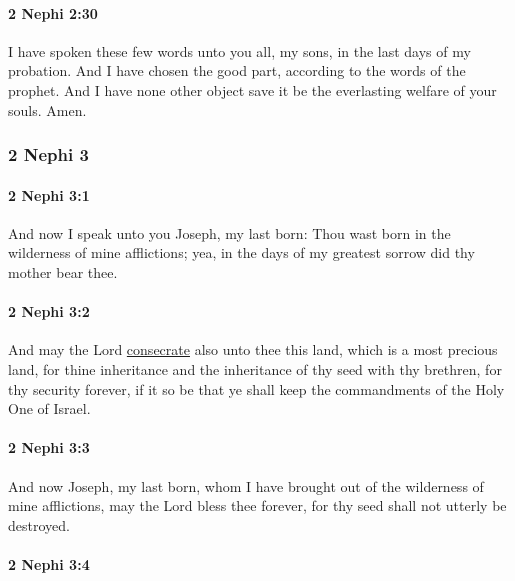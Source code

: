 		\paragraph{2 Nephi 2:30} %
			\label{2NEPHI-2-30}

			I have spoken these few words unto you all, my sons,
			in the last days of my probation.
			And I have chosen the good part, according to the words of the prophet.
			And I have none other object save it be the everlasting welfare of your souls.
			Amen.
			
	\subsubsection{2 Nephi 3} %
		\label{2NEPHI-3}
		
		\paragraph{2 Nephi 3:1} %
			\label{2NEPHI-3-1}

			And now I speak unto you Joseph, my last born:
			Thou wast born in the wilderness of mine afflictions;
			yea, in the days of my greatest sorrow did thy mother bear thee.

		\paragraph{2 Nephi 3:2} %
			\label{2NEPHI-3-2}

			And may the Lord \hyperref[CONSECRATION-1828]{consecrate} also unto thee this land,
			which is a most precious land,
			for thine inheritance and the inheritance of thy seed with thy brethren,
			for thy security forever,
			if it so be that ye shall keep the commandments of the Holy One of Israel.

		\paragraph{2 Nephi 3:3} %
			\label{2NEPHI-3-3}

			And now Joseph, my last born,
			whom I have brought out of the wilderness of mine afflictions,
			may the Lord bless thee forever,
			for thy seed shall not utterly be destroyed.

		\paragraph{2 Nephi 3:4} %
			\label{2NEPHI-3-4}

